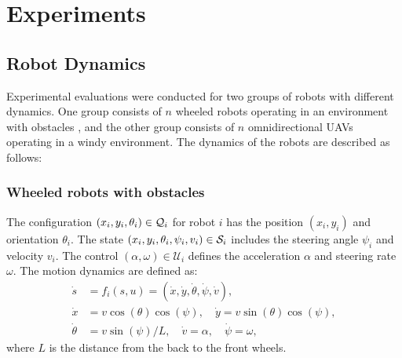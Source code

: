 \documentclass[letterpaper, 10 pt, conference]{ieeeconf}  %
\begin{document}
\section{Experiments}
\label{sec:experiments}

\subsection{Robot Dynamics}
Experimental evaluations were conducted for two groups of robots with different dynamics. One group consists of $n$ wheeled robots operating in an environment with obstacles \cite{plaku2021}, and the other group consists of $n$ omnidirectional UAVs operating in a windy environment. The dynamics of the robots are described as follows:

\subsubsection{Wheeled robots with obstacles}  The configuration $(x_i,y_i,\theta_i) \in \mathcal{Q}_i$ for robot $i$ has the position $(x_i,y_i)$ and orientation $\theta_i$. The state $(x_i,y_i,\theta_i,\psi_i,v_i) \in \mathcal{S}_i$ includes the steering angle $\psi_i$ and velocity $v_i$. The control $(\alpha, \omega) \in \mathcal{U}_i$ defines the acceleration $\alpha$ and steering rate $\omega$. The motion dynamics are defined as:
\begin{align}
\dot{s} &= f_i(s,u) = (\dot{x}, \dot{y}, \dot{\theta}, \dot{\psi}, \dot{v}), \\
\dot{x} &= v \cos(\theta) \cos(\psi), \quad \dot{y} = v \sin(\theta) \cos(\psi), \\
\dot{\theta} &= v \sin(\psi) / L, \quad  \dot{v} = \alpha, \quad \dot{\psi} = \omega,
\end{align}
where $L$ is the distance from the back to the front wheels.
\end{document}
